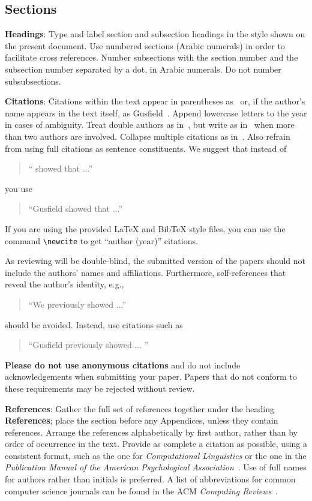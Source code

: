 \documentclass[11pt]{article}
\begin{document}
\subsection{Sections}

{\bf Headings}: Type and label section and subsection headings in the
style shown on the present document.  Use numbered sections (Arabic
numerals) in order to facilitate cross references. Number subsections
with the section number and the subsection number separated by a dot,
in Arabic numerals. Do not number subsubsections.

{\bf Citations}: Citations within the text appear
in parentheses as~\cite{Gusfield:97} or, if the author's name appears in
the text itself, as Gusfield~. 
Append lowercase letters to the year in cases of ambiguity.  
Treat double authors as in~\cite{Aho:72}, but write as
 in~\cite{Chandra:81} when more than two authors are involved. Collapse multiple citations as
in~\cite{Gusfield:97,Aho:72}. Also refrain from using full citations as sentence constituents. We
suggest that instead of
\begin{quote}
  ``\cite{Gusfield:97} showed that ...''
\end{quote}
you use
\begin{quote}
``Gusfield    showed that ...''
\end{quote}

If you are using the provided \LaTeX{} and Bib\TeX{} style files, you
can use the command \verb|\newcite| to get ``author (year)'' citations.

As reviewing will be double-blind, the submitted version of the papers should not include the
authors' names and affiliations. Furthermore, self-references that
reveal the author's identity, e.g.,
\begin{quote}
``We previously showed \cite{Gusfield:97} ...''  
\end{quote}
should be avoided. Instead, use citations such as 
\begin{quote}
``Gusfield 
previously showed ... ''
\end{quote}

\textbf{Please do not  use anonymous citations} and  do not include acknowledgements 
when submitting your paper. Papers that do not conform
to these requirements may be rejected without review. 

\textbf{References}: Gather the full set of references together under
the heading {\bf References}; place the section before any Appendices,
unless they contain references. Arrange the references alphabetically
by first author, rather than by order of occurrence in the text.
Provide as complete a citation as possible, using a consistent format,
such as the one for {\em Computational Linguistics\/} or the one in the 
{\em Publication Manual of the American 
Psychological Association\/}~\cite{APA:83}.  Use of full names for
authors rather than initials is preferred.  A list of abbreviations
for common computer science journals can be found in the ACM 
{\em Computing Reviews\/}~\cite{ACM:83}.
\end{document}
